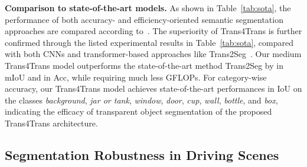\documentclass[journal]{IEEEtran}
\begin{document}
\noindent\textbf{Comparison to state-of-the-art models.}
As shown in Table~\ref{tab:sota}, the performance of both accuracy- and efficiency-oriented semantic segmentation approaches are compared according to~\cite{xie2020segmenting}. The superiority of Trans4Trans is further confirmed through the listed experimental results in Table~\ref{tab:sota}, compared with both CNNs and transformer-based approaches like Trans2Seg~\cite{xie2021segmenting}. Our medium Trans4Trans model outperforms the state-of-the-art method Trans2Seg by  in mIoU and  in Acc, while requiring much less GFLOPs. For category-wise accuracy, our Trans4Trans model achieves state-of-the-art performances in IoU on the classes \emph{background}, \emph{jar or tank}, \emph{window}, \emph{door}, \emph{cup}, \emph{wall}, \emph{bottle}, and \emph{box}, indicating the efficacy of transparent object segmentation of the proposed Trans4Trans architecture.


\subsection{Segmentation Robustness in Driving Scenes}
\label{sec:driving}
\end{document}
